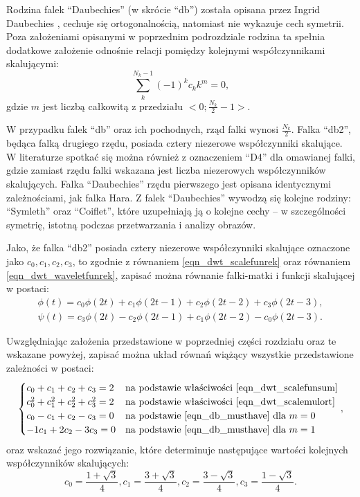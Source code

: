 Rodzina falek \enquote{Daubechies} (w skrócie \enquote{db}) została opisana przez Ingrid Daubechies \cite{vonesch_dbbasics}, cechuje się ortogonalnością, natomiast nie wykazuje cech symetrii. Poza założeniami opisanymi w poprzednim podrozdziale rodzina ta spełnia dodatkowe założenie odnośnie relacji pomiędzy kolejnymi współczynnikami skalującymi:
\begin{equation}
\sum _{k} ^{N_k-1} (-1)^{k} c_{k} k^{m} = 0 \label{eqn_db_musthave},
\end{equation}
gdzie $m$ jest liczbą całkowitą z przedziału $<0;\frac{N_k}{2}-1>$.

W przypadku falek \enquote{db} oraz ich pochodnych, rząd falki wynosi $\frac{N_k}{2}$. Falka \enquote{db2}, będąca falką drugiego rzędu, posiada cztery niezerowe współczynniki skalujące. W literaturze spotkać się można również z oznaczeniem \enquote{D4} dla omawianej falki, gdzie zamiast rzędu falki wskazana jest liczba niezerowych współczynników skalujących. Falka \enquote{Daubechies} rzędu pierwszego jest opisana identycznymi zależnościami, jak falka Hara. Z falek \enquote{Daubechies} wywodzą się kolejne rodziny: \enquote{Symleth} oraz \enquote{Coiflet}, które uzupełniają ją o kolejne cechy -- w szczególności symetrię, istotną podczas przetwarzania i analizy obrazów.

Jako, że falka \enquote{db2} posiada cztery niezerowe współczynniki skalujące oznaczone jako $c_0, c_1, c_2, c_3$, to zgodnie z równaniem \eqref{eqn_dwt_scalefunrek} oraz równaniem \eqref{eqn_dwt_waveletfunrek}, zapisać można równanie falki-matki i funkcji skalującej w postaci:
\begin{gather}
\phi(t) = c_0 \phi(2t) + c_1 \phi(2t - 1) + c_2 \phi(2t - 2) + c_3 \phi(2t - 3) \label{eqn_db2_scalefunrek}, \\
\psi(t) = c_3 \phi(2t) - c_2 \phi(2t - 1) + c_1 \phi(2t - 2) - c_0 \phi(2t - 3) \label{eqn_db2_waveletfunrek}.
\end{gather}

Uwzględniając założenia przedstawione w poprzedniej części rozdziału oraz te wskazane powyżej, zapisać można układ równań wiążący wszystkie przedstawione zależności w postaci:
\begin{equation}
\begin{cases}
	c_0 + c_1 + c_2 + c_3 = 2         & $na podstawie właściwości \eqref{eqn_dwt_scalefunsum}$ \\
	c_0^2 + c_1^2 + c_2^2 + c_3^2 = 2 & $na podstawie właściwości \eqref{eqn_dwt_scalemulort}$ \\
	c_0 - c_1 + c_2 - c_3 = 0         & $na podstawie \eqref{eqn_db_musthave} dla $ m = 0 \\
	- 1 c_1 + 2 c_2 - 3 c_3 = 0       & $na podstawie \eqref{eqn_db_musthave} dla $ m = 1
\end{cases}
\label{eqn_db2_system},
\end{equation}
oraz wskazać jego rozwiązanie, które determinuje następujące wartości kolejnych współczynników skalujących:
\begin{equation}
c_0 = \frac{1 + \sqrt{3}}{4}, c_1 = \frac{3 + \sqrt{3}}{4}, c_2 = \frac{3 - \sqrt{3}}{4}, c_3 = \frac{1 - \sqrt{3}}{4} \label{eqn_db2_coefs}.
\end{equation}

